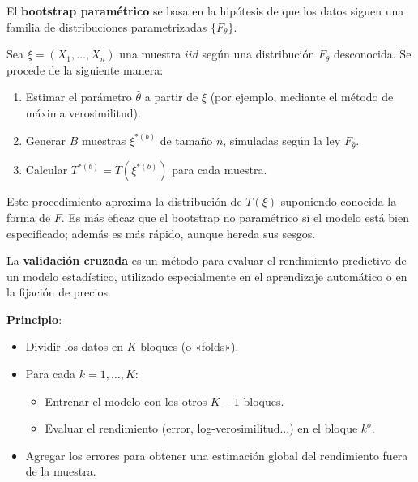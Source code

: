 \begin{f}
	
	El \textbf{bootstrap paramétrico} se basa en la hipótesis de que los datos siguen una familia de distribuciones parametrizadas \(\{F_\theta\}\).
	
	Sea \(\xi = (X_1, \ldots, X_n)\) una muestra \(iid\) según una distribución \(F_\theta\) desconocida. Se procede de la siguiente manera:
	\begin{enumerate}
		\item Estimar el parámetro \(\hat{\theta}\) a partir de \(\xi\) (por ejemplo, mediante el método de máxima verosimilitud).
		\item Generar \(B\) muestras \(\xi^{\ast(b)}\) de tamaño \(n\), simuladas según la ley \(F_{\hat{\theta}}\).
		\item Calcular \(T^{\ast(b)} = T(\xi^{\ast(b)})\) para cada muestra.
	\end{enumerate}
	
Este procedimiento aproxima la distribución de \(T(\xi)\) suponiendo conocida la forma de \(F\). Es más eficaz que el bootstrap no paramétrico si el modelo está bien especificado; además es más rápido, aunque hereda sus sesgos.		
\end{f}

\begin{f}
	
	La \textbf{validación cruzada} es un método para evaluar el rendimiento predictivo de un modelo estadístico, utilizado especialmente en el aprendizaje automático o en la fijación de precios.
	
	\textbf{Principio}:
	\begin{itemize}
		\item Dividir los datos en \(K\) bloques (o «folds»).
		\item Para cada \(k = 1,\ldots,K\):
		\begin{itemize}
			\item Entrenar el modelo con los otros \(K-1\) bloques.
			\item Evaluar el rendimiento (error, log-verosimilitud...) en el bloque \(k^{o}\).
		\end{itemize}
		\item Agregar los errores para obtener una estimación global del rendimiento fuera de la muestra.
	\end{itemize}
	
\end{f}

